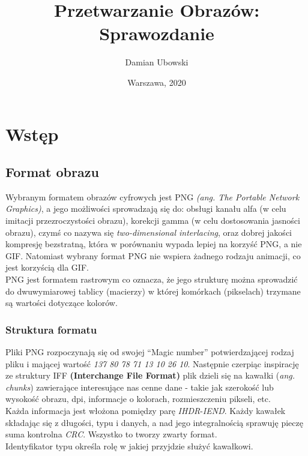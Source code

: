 \documentclass[a4paper,12pt]{book}
\title{\Large{\textbf{Przetwarzanie Obrazów: Sprawozdanie}}}
\author{Damian Ubowski}
\date{Warszawa, 2020}
\begin{document}
\maketitle
\tableofcontents

\chapter{Wstęp}
\section{Format obrazu}
Wybranym formatem obrazów cyfrowych jest PNG \textit{(ang. The Portable Network Graphics)}, a jego możliwości sprowadzają się do: obsługi kanału alfa (w celu imitacji przezroczystości obrazu), korekcji gamma (w celu dostosowania jasności obrazu), czymś co nazywa się \textit{two-dimensional interlacing}, oraz dobrej jakości kompresję bezstratną, która w porównaniu wypada lepiej na korzyść PNG, a nie GIF. Natomiast wybrany format PNG nie wspiera żadnego rodzaju animacji, co jest korzyścią dla GIF. \\
PNG jest formatem rastrowym co oznacza, że jego strukturę można sprowadzić do dwuwymiarowej tablicy (macierzy) w której komórkach (pikselach) trzymane są wartości dotyczące kolorów. 

\subsection*{Struktura formatu}
Pliki PNG rozpoczynają się od swojej ``Magic number'' potwierdzającej rodzaj pliku i mającej wartość \textit{137 80 78 71 13 10 26 10}. Następnie czerpiąc inspirację ze struktury IFF \textbf{(Interchange File Format)} plik dzieli się na kawałki (\textit{ang. chunks}) zawierające interesujące nas cenne dane - takie jak szerokość lub wysokość obrazu, dpi, informacje o kolorach, rozmieszczeniu pikseli, etc. \\
Każda informacja jest włożona pomiędzy parę \textit{IHDR}-\textit{IEND}. Każdy kawałek składając się z długości, typu i danych, a nad jego integralnością sprawuję pieczę suma kontrolna \textit{CRC}. Wszystko to tworzy zwarty format. \\
Identyfikator typu określa rolę w jakiej przyjdzie służyć kawałkowi. 
\end{document}
